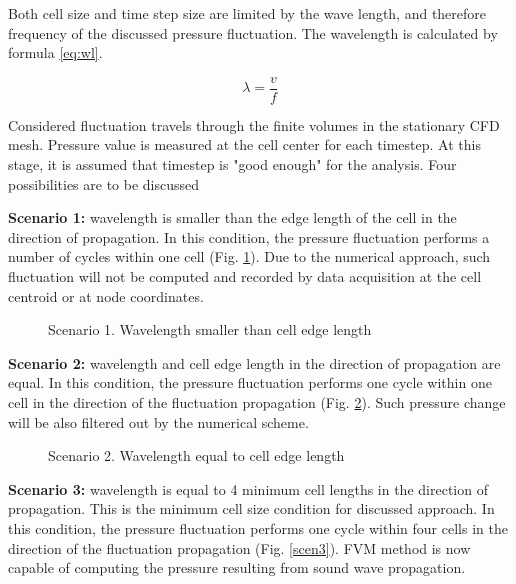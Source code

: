 Both cell size and time step size are limited by the wave length, and therefore frequency of the discussed pressure fluctuation. The wavelength is calculated by formula \ref{eq:wl}.

\begin{equation} \label{eq:wl}
\lambda = \frac{v}{f}
\end{equation}

Considered fluctuation travels through the finite volumes in the stationary CFD mesh. Pressure value is measured at the cell center for each timestep. At this stage, it is assumed that timestep is "good enough" for the analysis. Four possibilities are to be discussed 

\textbf{Scenario 1:} wavelength is smaller than the edge length of the cell in the direction of propagation. In this condition, the pressure fluctuation performs a number of cycles within one cell (Fig. \ref{scen1}). Due to the numerical approach, such fluctuation will not be computed and recorded by data acquisition at the cell centroid or at node coordinates.

\begin{figure}[h!]
\centering %
\caption{Scenario 1. Wavelength smaller than cell edge length}
\label{scen1}
\end{figure}

\textbf{Scenario 2:} wavelength and cell edge length in the direction of propagation are equal. In this condition, the pressure fluctuation performs one cycle within one cell in the direction of the fluctuation propagation (Fig. \ref{scen2}). Such pressure change will be also filtered out by the numerical scheme.

\begin{figure}[h!]
\centering %
\caption{Scenario 2. Wavelength equal to cell edge length}
\label{scen2}
\end{figure}

\textbf{Scenario 3:} wavelength is equal to 4 minimum cell lengths in the direction of propagation. This is the minimum cell size condition for discussed approach. In this condition, the pressure fluctuation performs one cycle within four cells in the direction of the fluctuation propagation (Fig. \ref{scen3}). FVM method is now capable of computing the pressure resulting from sound wave propagation.

